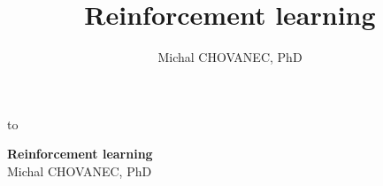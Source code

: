 \documentclass[xcolor=dvipsnames]{beamer}
\title{\color{white} \bf Reinforcement learning}
\author{\color{white} Michal CHOVANEC, PhD}
\date[EURP]{}
\begin{document}
{
    \usebackgroundtemplate
    {
        \vbox to 
    }
    \begin{frame}



    { \vfill
     \vfill
     \vfill
     \vfill
     \vfill

      {
        \hfill {\LARGE \color{white} \bf Reinforcement learning} \\
        \hfill {\LARGE \color{white} Michal CHOVANEC, PhD} \\
      }
    }


    \end{frame}
}
\end{document}
